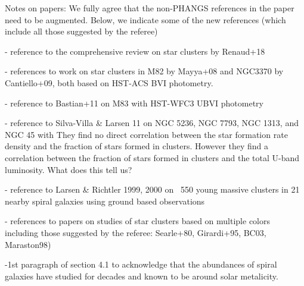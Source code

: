 Notes on papers:
We fully agree that the non-PHANGS references in the paper need to be augmented.  Below, we indicate some of the new references (which include all those suggested by the referee)

- reference to the comprehensive review on star clusters by Renaud+18 

- references to work on star clusters in M82 by Mayya+08 and NGC3370 by Cantiello+09, both based on HST-ACS BVI photometry.

- reference to Bastian+11 on M83 with HST-WFC3 UBVI photometry
    
- reference to Silva-Villa & Larsen \citep{silva-villa_star_2011} 11 on NGC 5236, NGC 7793, NGC 1313,
and NGC 45 with 
They find no direct correlation between the star formation rate density and the fraction of stars formed in clusters. However they find a correlation between the fraction of stars formed in clusters and the total U-band luminosity. 
What does this tell us?

- reference to Larsen & Richtler 1999, 2000  on ~550 young massive clusters in 21 nearby spiral galaxies using ground based observations 


- references to papers on studies of star clusters based on multiple colors including those suggested by the referee: Searle+80, Girardi+95, BC03, Maraston98)

-1st paragraph of section 4.1 to acknowledge that the abundances of spiral galaxies have studied for decades and known to be around solar metalicity.

